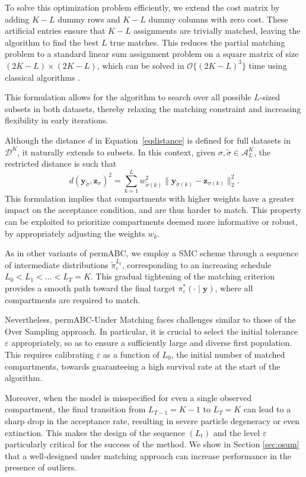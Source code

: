 \documentclass[11pt,a4paper]{article}
\def\dataspace{\mathcal{D}}
\def\obsdata{\mathbf{y}}
\def\simdata{\mathbf{z}}
\theoremstyle{plain}
\theoremstyle{definition}
\theoremstyle{remark}
\begin{document}
To solve this optimization problem efficiently, we extend the cost matrix by adding \( K - L \) dummy rows and \( K - L \) dummy columns with zero cost. These artificial entries ensure that \( K - L \) assignments are trivially matched, leaving the algorithm to find the best \( L \) true matches. This reduces the partial matching problem to a standard linear sum assignment problem on a square matrix of size \( (2K - L) \times (2K - L) \), which can be solved in \( \mathcal{O}\{(2K-L)^3\} \) time using classical algorithms \citep{crouseImplementing2DRectangular2016a}. 

This formulation allows for the algorithm to search over all possible \( L \)-sized subsets in both datasets, thereby relaxing the matching constraint and increasing flexibility in early iterations.

Although the distance \( d \) in Equation~\eqref{eqdistance} is defined for full datasets in \( \dataspace^K \), it naturally extends to subsets. In this context, given \( \sigma, \tilde \sigma \in \mathcal{A}_L^K \), the restricted distance is such that
\[
d(\obsdata_{\tilde \sigma}, \simdata_{\sigma})^2 = {\sum_{k=1}^L w_{\tilde \sigma(k)}^2 \| \obsdata_{\tilde \sigma(k)} - \simdata_{\sigma(k)} \|_2^2}.
\]
This formulation implies that compartments with higher weights have a greater impact on the acceptance condition, and are thus harder to match. This property can be exploited to prioritize compartments deemed more informative or robust, by appropriately adjusting the weights \( w_k \).

As in other variants of permABC, we employ a SMC scheme through a sequence of intermediate distributions \( \tilde{\pi}_\varepsilon^{L_t} \), corresponding to an increasing schedule \( L_0 < L_1 < \dots < L_T = K \). This gradual tightening of the matching criterion provides a smooth path toward the final target \( \pi^*_\varepsilon(\cdot \mid \obsdata) \), where all compartments are required to match.

Nevertheless, permABC-Under Matching faces challenges similar to those of the Over Sampling approach. In particular, it is crucial to select the initial tolerance \( \varepsilon \) appropriately, so as to ensure a sufficiently large and diverse first population. This requires calibrating \( \varepsilon \) as a function of \( L_0 \), the initial number of matched compartments, towards guaranteeing a high survival rate at the start of the algorithm.

Moreover, when the model is misspecified for even a single observed compartment, the final transition from \( L_{T-1} = K - 1 \) to \( L_T = K \) can lead to a sharp drop in the acceptance rate, resulting in severe particle degeneracy or even extinction. This makes the design of the sequence \( (L_t) \) and the level \( \varepsilon \) particularly critical for the success of the method. 
We show in Section \ref{sec:osum} that a well-designed under matching approach can increase performance in the presence of outliers.
\end{document}

